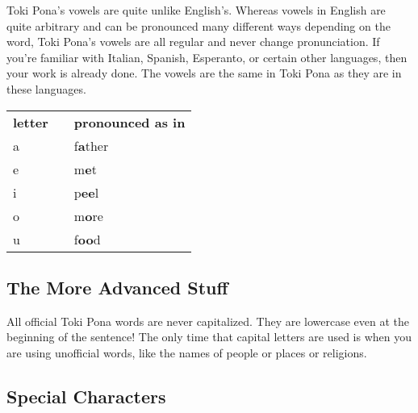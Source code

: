 Toki Pona's vowels are quite unlike English's. Whereas vowels in English are quite arbitrary and can be pronounced many different ways depending on the word, Toki Pona's vowels are all regular and never change pronunciation.
If you're familiar with Italian, Spanish, Esperanto, or certain other languages, then your work is already done. The vowels are the same in Toki Pona as they are in these languages.

\begin{supertabular}{p{2cm}|ll}
    \textbf{letter} &  & \textbf{pronounced as in} \\ %
    a               &  & f\textbf{a}ther           \\ %
    e               &  & m\textbf{e}t              \\ %
    i               &  & p\textbf{ee}l             \\ %
    o               &  & m\textbf{o}re             \\ %
    u               &  & f\textbf{oo}d             \\ %
\end{supertabular}

%
\subsection*{The More Advanced Stuff}
%
All official Toki Pona words are never capitalized.
They are lowercase even at the beginning of the sentence!
The only time that capital letters are used is when you are using unofficial words, like the names of people or places or religions.
%
%
\subsection*{Special Characters}
%

